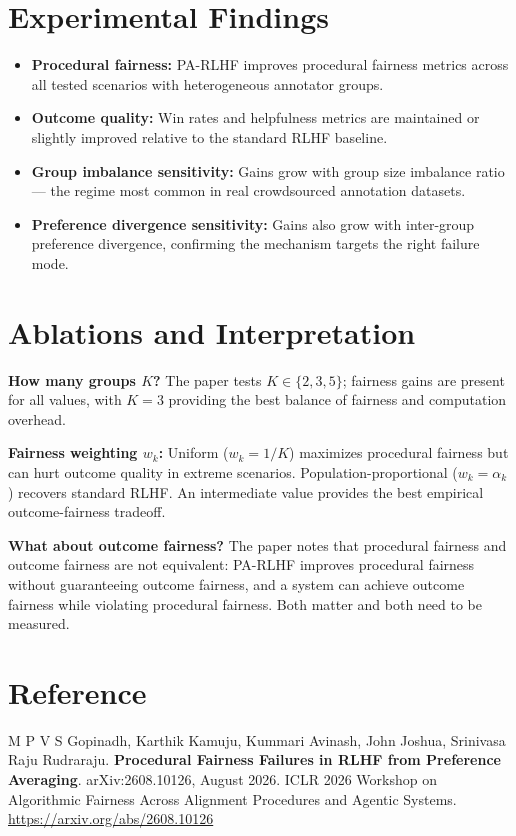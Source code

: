 \documentclass[10pt,twocolumn]{article}
\begin{document}
\section{Experimental Findings}

\begin{itemize}[itemsep=2pt,parsep=0pt]
  \item \textbf{Procedural fairness:} PA-RLHF improves procedural fairness metrics
    across all tested scenarios with heterogeneous annotator groups.
  \item \textbf{Outcome quality:} Win rates and helpfulness metrics are maintained
    or slightly improved relative to the standard RLHF baseline.
  \item \textbf{Group imbalance sensitivity:} Gains grow with group size imbalance
    ratio — the regime most common in real crowdsourced annotation datasets.
  \item \textbf{Preference divergence sensitivity:} Gains also grow with inter-group
    preference divergence, confirming the mechanism targets the right failure mode.
\end{itemize}

\section{Ablations and Interpretation}

\textbf{How many groups $K$?} The paper tests $K \in \{2, 3, 5\}$; fairness gains
are present for all values, with $K=3$ providing the best balance of fairness and
computation overhead.

\textbf{Fairness weighting $w_k$:} Uniform ($w_k = 1/K$) maximizes procedural
fairness but can hurt outcome quality in extreme scenarios. Population-proportional
($w_k = \alpha_k$) recovers standard RLHF. An intermediate value provides the
best empirical outcome-fairness tradeoff.

\textbf{What about outcome fairness?} The paper notes that procedural fairness and
outcome fairness are not equivalent: PA-RLHF improves procedural fairness without
guaranteeing outcome fairness, and a system can achieve outcome fairness while
violating procedural fairness. Both matter and both need to be measured.

\section*{Reference}

M P V S Gopinadh, Karthik Kamuju, Kummari Avinash, John Joshua,
Srinivasa Raju Rudraraju.
\textbf{Procedural Fairness Failures in RLHF from Preference Averaging}.
arXiv:2608.10126, August 2026.
ICLR 2026 Workshop on Algorithmic Fairness Across Alignment Procedures and Agentic Systems.
\url{https://arxiv.org/abs/2608.10126}
\end{document}
